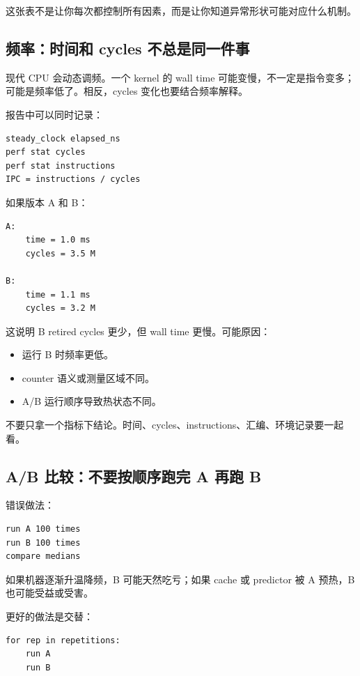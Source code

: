 这张表不是让你每次都控制所有因素，而是让你知道异常形状可能对应什么机制。

\subsection{频率：时间和 cycles 不总是同一件事}

现代 CPU 会动态调频。一个 kernel 的 wall time 可能变慢，不一定是指令变多；可能是频率低了。相反，cycles 变化也要结合频率解释。

报告中可以同时记录：

\begin{lstlisting}
steady_clock elapsed_ns
perf stat cycles
perf stat instructions
IPC = instructions / cycles
\end{lstlisting}

如果版本 A 和 B：

\begin{lstlisting}
A:
    time = 1.0 ms
    cycles = 3.5 M

B:
    time = 1.1 ms
    cycles = 3.2 M
\end{lstlisting}

这说明 B retired cycles 更少，但 wall time 更慢。可能原因：

\begin{itemize}
  \item 运行 B 时频率更低。
  \item counter 语义或测量区域不同。
  \item A/B 运行顺序导致热状态不同。
\end{itemize}

不要只拿一个指标下结论。时间、cycles、instructions、汇编、环境记录要一起看。

\subsection{A/B 比较：不要按顺序跑完 A 再跑 B}

错误做法：

\begin{lstlisting}
run A 100 times
run B 100 times
compare medians
\end{lstlisting}

如果机器逐渐升温降频，B 可能天然吃亏；如果 cache 或 predictor 被 A 预热，B 也可能受益或受害。

更好的做法是交替：

\begin{lstlisting}
for rep in repetitions:
    run A
    run B
\end{lstlisting}

